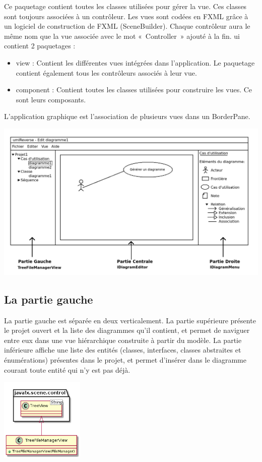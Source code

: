 \documentclass[a4paper,10pt]{article}
\begin{document}
    Ce paquetage contient toutes les classes utilisées pour gérer la vue. Ces classes sont toujours associées à un contrôleur.
    Les vues sont codées en FXML grâce à un logiciel de construction de FXML (SceneBuilder). Chaque contrôleur aura le même nom
    que la vue associée avec le mot «~Controller~» ajouté à la fin.
    ui contient 2 paquetages :
    \begin{itemize}
    \item view : Contient les différentes vues intégrées dans l'application. Le paquetage contient également tous les contrôleurs associés à leur vue.
    \item component : Contient toutes les classes utilisées pour construire les vues. Ce sont leurs composants.
    \end{itemize}
    L'application graphique est l'association de plusieurs vues dans un BorderPane.
    
    \begin{center}
	\includegraphics[width=\textwidth]{imgDAL/maquette.png}
    \end{center}

  \subsection{La partie gauche}
    La partie gauche est séparée en deux verticalement. La partie supérieure présente le projet ouvert 
    et la liste des diagrammes qu’il contient, et permet de naviguer entre eux dans une vue hiérarchique 
    construite à partir du modèle. La partie inférieure affiche une liste des entités (classes, interfaces, 
    classes abstraites et énumérations) présentes dans le projet, et permet d'insérer dans le diagramme 
    courant toute entité qui n'y est pas déjà.
    
    \begin{center}
	\includegraphics[width=4cm]{imgDAL/partieGaucheVue.png}
    \end{center}
\end{document}

